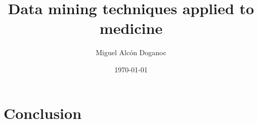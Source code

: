 \documentclass[sigconf,authorversion]{acmart}
\title{Data mining techniques applied to medicine}
\author{Miguel Alcón Doganoc}
\affiliation{%
  \institution{Universitat Politècnica de Catalunya}
  \city{Barcelona}
  \country{Spain}}
\date{\today}
\begin{document}


\maketitle







\section{Conclusion}




\end{document}
